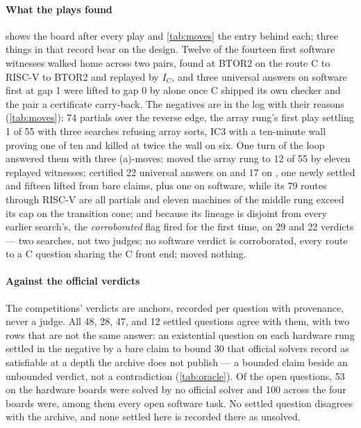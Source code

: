 \paragraph{What the plays found}
 shows the board after every play and
\cref{tab:moves} the entry behind each; three things in that record
bear on the design. Twelve of the fourteen first software witnesses
walked home across two pairs, found at BTOR2 on the route C to RISC-V
to BTOR2 and replayed by $I_C$, and three
universal answers on software first  at gap 1 were
lifted to gap 0 by  alone once C shipped its own
checker and the pair a certificate carry-back. The negatives are in
the log with their reasons (\cref{tab:moves}): 74 partials over the
reverse edge, the array rung's first play settling 1 of 55 with three
searches refusing array sorts, IC3 with a ten-minute wall proving one
of ten and killed at twice the wall on six. One turn of the loop
answered them with three (a)-moves:
 moved the array rung to 12 of 55 by eleven
replayed witnesses;  certified 22 universal answers
on  and 17 on , one newly
settled and fifteen lifted from bare claims, plus one on software,
while its 79 routes through RISC-V are all partials and eleven
machines of the middle rung exceed its cap on the transition cone; and because its
lineage is disjoint from every earlier search's, the
\emph{corroborated} flag fired for the first time, on 29 and 22
verdicts --- two searches, not two judges; no software verdict is
corroborated, every route to a C question sharing the C front end;
 moved nothing.

\paragraph{Against the official verdicts}
The competitions' verdicts are anchors, recorded per question with
provenance, never a judge. All
48, 28, 47, and 12 settled questions agree with them, with two rows
that are not the same answer: an existential question on each
hardware rung settled in the negative by a bare claim to bound 30
that official solvers record as satisfiable at a depth the archive
does not publish --- a bounded claim beside an unbounded verdict, not
a contradiction (\cref{tab:oracle}). Of the open questions, 53 on
the hardware boards were solved by no official solver and 100 across
the four boards were, among them every open software task. No
settled question disagrees with the archive, and none settled here is
recorded there as unsolved.

